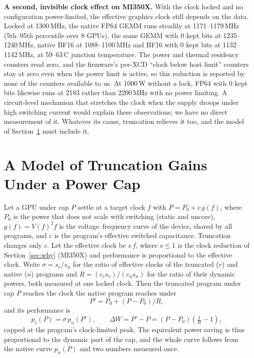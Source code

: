 \documentclass[conference]{IEEEtran}
\newcommand{\W}{\,W}
\begin{document}
\textbf{A second, invisible clock effect on MI350X.} With the clock locked and no configuration power-limited, the
effective graphics clock still depends on the data. Locked at 1300\,MHz, the native FP64 GEMM runs steadily at
1171--1179\,MHz (5th--95th percentile over 8 GPUs), the same GEMM with 0 kept bits at 1235--1240\,MHz, native BF16 at
1088--1100\,MHz and BF16 with 0 kept bits at 1132--1142\,MHz, at 59--63\,\textdegree C junction temperature. The
power and thermal residency counters read zero, and the firmware's per-XCD ``clock below host limit'' counters stay
at zero even when the power limit is active, so this reduction is reported by none of the counters available to us.
At 1000\W{} without a lock, FP64 with 0 kept bits likewise runs at 2183 rather than 2200\,MHz with no power limiting.
A circuit-level mechanism that stretches the clock when the supply droops under high switching current would explain
these observations; we have no direct measurement of it. Whatever its cause, truncation relieves it too, and the model
of Section~\ref{sec:model} must include it.

\section{A Model of Truncation Gains Under a Power Cap}\label{sec:model}

Let a GPU under cap $P$ settle at a target clock $f$ with $P = P_0 + c\,g(f)$, where $P_0$ is the power that does
not scale with switching (static and uncore), $g(f) = V(f)^2 f$ is the voltage--frequency curve of the device, shared
by all programs, and $c$ is the program's effective switched capacitance. Truncation changes only $c$. Let the effective
clock be $s\,f$, where $s\le1$ is the clock reduction of Section~\ref{sec:why} (MI350X) and performance is
proportional to the effective clock. Write $\sigma = s_r/s_n$ for the ratio of effective clocks of the truncated
($r$) and native ($n$) programs and $R = (c_r s_r)/(c_n s_n)$ for the ratio of their dynamic powers, both measured at
one locked clock. Then the truncated program under cap $P$ reaches the clock the native program reaches under
\begin{equation}
P' = P_0 + (P - P_0)/R,
\end{equation}
and its performance is
\begin{equation}
p_r(P) = \sigma\,p_n(P'), \qquad \Delta W = P' - P = (P-P_0)\left(\tfrac{1}{R}-1\right),
\end{equation}
capped at the program's clock-limited peak. The equivalent power saving is thus proportional to the dynamic part of
the cap, and the whole curve follows from the native curve $p_n(P)$ and two numbers measured once.
\end{document}
